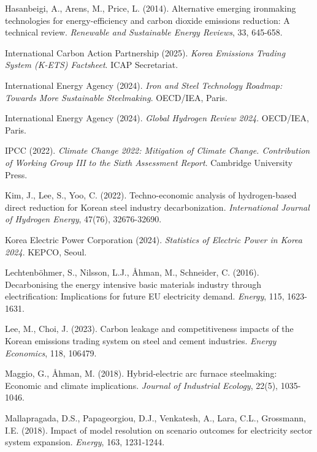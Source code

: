 \documentclass[preprint,5p,authoryear]{elsarticle}
\begin{document}
\begin{thebibliography}{99}
 Hasanbeigi, A., Arens, M., Price, L. (2014). Alternative emerging ironmaking technologies for energy-efficiency and carbon dioxide emissions reduction: A technical review. \textit{Renewable and Sustainable Energy Reviews}, 33, 645-658.

 International Carbon Action Partnership (2025). \textit{Korea Emissions Trading System (K-ETS) Factsheet}. ICAP Secretariat.

 International Energy Agency (2024). \textit{Iron and Steel Technology Roadmap: Towards More Sustainable Steelmaking}. OECD/IEA, Paris.

 International Energy Agency (2024). \textit{Global Hydrogen Review 2024}. OECD/IEA, Paris.

 IPCC (2022). \textit{Climate Change 2022: Mitigation of Climate Change. Contribution of Working Group III to the Sixth Assessment Report}. Cambridge University Press.

 Kim, J., Lee, S., Yoo, C. (2022). Techno-economic analysis of hydrogen-based direct reduction for Korean steel industry decarbonization. \textit{International Journal of Hydrogen Energy}, 47(76), 32676-32690.

 Korea Electric Power Corporation (2024). \textit{Statistics of Electric Power in Korea 2024}. KEPCO, Seoul.

 Lechtenböhmer, S., Nilsson, L.J., Åhman, M., Schneider, C. (2016). Decarbonising the energy intensive basic materials industry through electrification: Implications for future EU electricity demand. \textit{Energy}, 115, 1623-1631.

 Lee, M., Choi, J. (2023). Carbon leakage and competitiveness impacts of the Korean emissions trading system on steel and cement industries. \textit{Energy Economics}, 118, 106479.

 Maggio, G., Åhman, M. (2018). Hybrid-electric arc furnace steelmaking: Economic and climate implications. \textit{Journal of Industrial Ecology}, 22(5), 1035-1046.

 Mallapragada, D.S., Papageorgiou, D.J., Venkatesh, A., Lara, C.L., Grossmann, I.E. (2018). Impact of model resolution on scenario outcomes for electricity sector system expansion. \textit{Energy}, 163, 1231-1244.


\end{thebibliography}
\end{document}
